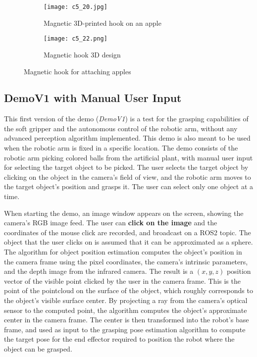 \begin{figure}[t]
    \centering
    \begin{subfigure}{0.55\textwidth}
        \texttt{[image: c5\_20.jpg]}
        \caption{Magnetic 3D-printed hook on an apple}
        \label{fig:hook3dprint}
    \end{subfigure}
    \hfill %
    \begin{subfigure}{0.4\textwidth}
        \texttt{[image: c5\_22.png]}
        \caption{Magnetic hook 3D design}
        \label{fig:hookdesign}
    \end{subfigure}
    \caption{Magnetic hook for attaching apples}
    \label{fig:hook}
\end{figure}

\subsection{DemoV1 with Manual User Input}

This first version of the demo (\textit{DemoV1}) is a test for the grasping capabilities of the soft gripper and
the autonomous control of the robotic arm, without any advanced perception algorithm implemented. 
This demo is also meant to be used when the robotic arm is fixed in a specific location. The demo consists of
the robotic arm picking colored balls from the artificial plant, with manual user input for selecting the target
object to be picked. The user selects the target object by clicking on the object in the camera's field of view,
and the robotic arm moves to the target object's position and grasps it. The user can select only one object at 
a time.

When starting the demo, an image window appears on the screen, showing the camera's RGB image feed.
The user can \textbf{click on the image} and the coordinates of the mouse click are recorded, and broadcast on a ROS2
topic. The object that the user clicks on is assumed that it can be approximated as a sphere.
The algorithm for object position estimation computes the object's position in the camera frame
using the pixel coordinates, the camera's intrinsic parameters, and the depth image from the infrared camera.
The result is a $(x, y, z)$ position vector of the visible point clicked by the user in the camera frame. 
This is the point of the pointcloud on the surface of the object, which roughly corresponds to the 
object's visible surface center. By projecting a ray from the camera's optical sensor to the computed point,
the algorithm computes the object's approximate center in the camera frame. The center is then transformed
into the robot's base frame, and used as input to the grasping pose estimation algorithm to compute the target pose
for the end effector required to position the robot where the object can be grasped.

